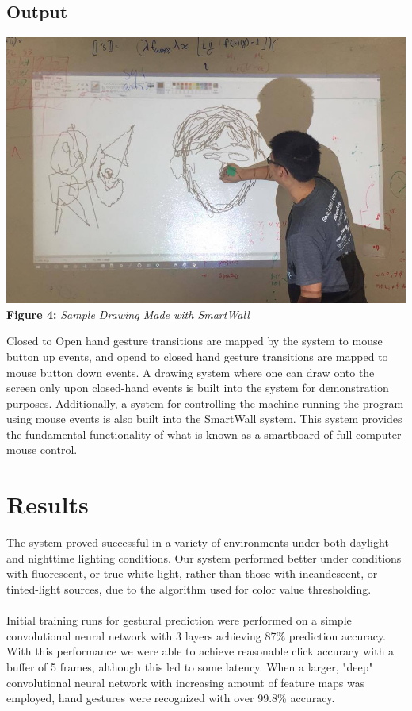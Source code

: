 \documentclass[twoside,twocolumn]{article}
\begin{document}
\subsection{Output}

\begin{center}
	\includegraphics[scale=0.19]{sample} \\
	\vspace{0.25cm}
	\small{\textbf{Figure 4:} \textit{Sample Drawing Made with SmartWall}}
\end{center}

Closed to Open hand gesture transitions are mapped by the system to mouse button up events, and opend to closed hand gesture transitions are mapped to mouse button down events. A drawing system where one can draw onto the screen only upon closed-hand events is built into the system for demonstration purposes. Additionally, a system for controlling the machine running the program using mouse events is also built into the SmartWall system. This system provides the fundamental functionality of what is known as a smartboard of full computer mouse control.

\section{Results}
The system proved successful in a variety of environments under both daylight and nighttime lighting conditions. Our system performed better under conditions with fluorescent, or true-white light, rather than those with incandescent, or tinted-light sources, due to the algorithm used for color value thresholding. \\ \\Initial training runs for gestural prediction were performed on a simple convolutional neural network with 3 layers achieving 87\% prediction accuracy. With this performance we were able to achieve reasonable click accuracy with a buffer of 5 frames, although this led to some latency. When a larger, "deep" convolutional neural network with increasing amount of feature maps was employed, hand gestures were recognized with over 99.8\% accuracy. 
\end{document}
